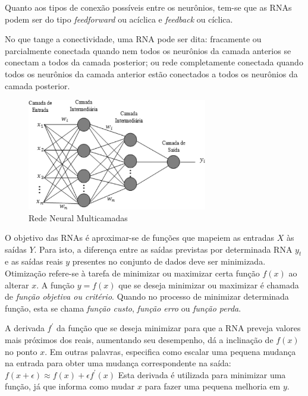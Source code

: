 Quanto aos tipos de conexão possíveis entre os neurônios, tem-se que as RNAs podem ser do tipo \emph{feedforward} ou acíclica  e \emph{feedback} ou cíclica.

No que tange a conectividade, uma RNA pode ser dita: fracamente ou parcialmente conectada quando nem todos os neurônios da camada anterios se conectam a todos da camada posterior; ou rede completamente conectada quando todos os neurônios da camada anterior estão conectados a todos os neurônios da camada posterior.

\begin{figure}[ht]
	\centering
	\includegraphics[width=0.7\textwidth]{img/mlprna.jpg}
	\caption{Rede Neural Multicamadas}
	\label{fig:mlp}
\end{figure}

O objetivo das RNAs é aproximar-se de funções que mapeiem as entradas $X$ às saídas $Y$. Para isto, a diferença entre as saídas previstas por determinada RNA $y_t$ e as saídas reais $y$ presentes no conjunto de dados deve ser minimizada.
Otimização refere-se à tarefa de minimizar ou maximizar certa função $f(x)$ ao alterar $x$.
A função $y=f(x)$ que se deseja minimizar ou maximizar é chamada de \emph{função objetiva ou critério}. Quando no processo de minimizar determinada função, esta se chama \emph{função custo}, \emph{função erro} ou \emph{função perda}.

A derivada $f^\prime$ da função que se deseja minimizar para que a RNA preveja valores mais próximos dos reais, aumentando seu desempenho, dá a inclinação de $f(x)$ no ponto $x$. Em outras palavras, especifica como escalar uma pequena mudança na entrada para obter uma mudança correspondente na saída: $f(x+\epsilon) \approx f(x) + \epsilon f^\prime(x)$
Esta derivada é utilizada para minimizar uma função, já que informa como mudar $x$ para fazer uma pequena melhoria em $y$.

